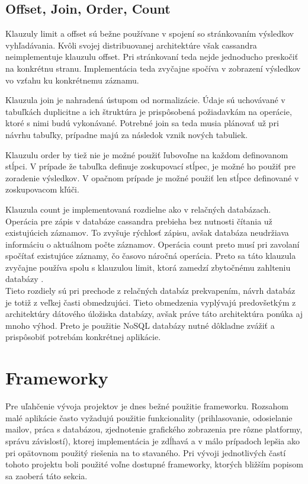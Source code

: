 	\subsection{Offset, Join, Order, Count}
	Klauzuly limit a offset sú bežne používane v spojení so stránkovaním výsledkov vyhľadávania. Kvôli svojej distribuovanej architektúre však cassandra neimplementuje klauzulu offset. Pri stránkovaní teda nejde jednoducho preskočiť na konkrétnu stranu. Implementácia teda zvyčajne spočíva v zobrazení výsledkov vo vzťahu ku konkrétnemu záznamu.
	
	Klauzula join je nahradená ústupom od normalizácie. Údaje sú uchovávané v tabuľkách duplicitne a ich štruktúra je prispôsobená požiadavkám na operácie, ktoré s nimi budú vykonávané. Potrebné join sa teda musia plánovať už pri návrhu tabuľky, prípadne majú za následok vznik nových tabuliek.
	
	Klauzulu order by tiež nie je možné použiť ľubovoľne na každom definovanom stĺpci. V prípade že tabuľka definuje zoskupovací stĺpec, je možné ho použiť pre zoradenie výsledkov. V opačnom prípade je možné použiť len stĺpce definované v zoskupovacom kľúči.
	
	Klauzula count je implementovaná rozdielne ako v relačných databázach. Operácia pre zápis v databáze cassandra prebieha bez nutnosti čítania už existujúcich záznamov. To zvyšuje rýchlosť zápisu, avšak databáza neudržiava informáciu o aktuálnom počte záznamov. Operácia count preto musí pri zavolaní spočítať existujúce záznamy, čo časovo náročná operácia. Preto sa táto klauzula zvyčajne používa spolu s klauzulou limit, ktorá zamedzí zbytočnému zahlteniu databázy \cite{cascount}. \\
	
	Tieto rozdiely sú pri prechode z relačných databáz prekvapením, návrh databáz je totiž z veľkej časti obmedzujúci. Tieto obmedzenia vyplývajú predovšetkým z architektúry dátového úložiska databázy, avšak práve táto architektúra ponúka aj mnoho výhod. Preto je použitie NoSQL databázy nutné dôkladne zvážiť a prispôsobiť potrebám konkrétnej aplikácie.
	
\section{Frameworky}
	Pre uľahčenie vývoja projektov je dnes bežné použitie frameworku. Rozsahom malé aplikácie často vyžadujú použitie funkcionality (prihlasovanie, odosielanie mailov, práca s databázou, zjednotenie grafického zobrazenia pre rôzne platformy, správu závislostí), ktorej implementácia je zdĺhavá a v málo prípadoch lepšia ako pri opätovnom použitý riešenia na to stavaného. Pri vývoji jednotlivých častí tohoto projektu boli použité voľne dostupné frameworky, ktorých bližším popisom sa zaoberá táto sekcia.

